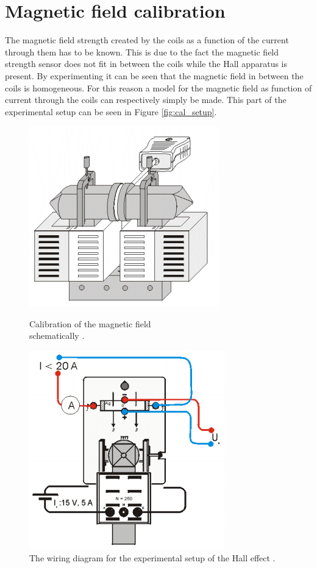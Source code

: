 \section{Magnetic field calibration}
The magnetic field strength created by the coils as a function of the current through them has to be known. This is due to the fact the magnetic field strength sensor does not fit in between the coils while the Hall apparatus is present. By experimenting it can be seen that the magnetic field in between the coils is homogeneous. For this reason a model for the magnetic field as function of current through the coils can respectively simply be made. This part of the experimental setup can be seen in Figure \ref{fig:cal_setup}.\\
    \begin{figure}[!htbp]
    \begin{center}
        \begin{minipage}[t]{0.45\textwidth}
            \includegraphics[scale=0.8]{figuren/schematic_calibration.png}
            \caption{Calibration of the magnetic field \\ schematically  \cite{halleffectzilver}.}\label{fig:cal_setup}
        \end{minipage}
        \begin{minipage}[t]{0.45\textwidth}
            \includegraphics[scale=0.8]{figuren/experimental_setup.png}
            \caption{The wiring diagram for the experimental setup of the Hall effect \cite{halleffectzilver}.}\label{fig:experimental_setup}
        \end{minipage}
    \end{center}
\end{figure}
